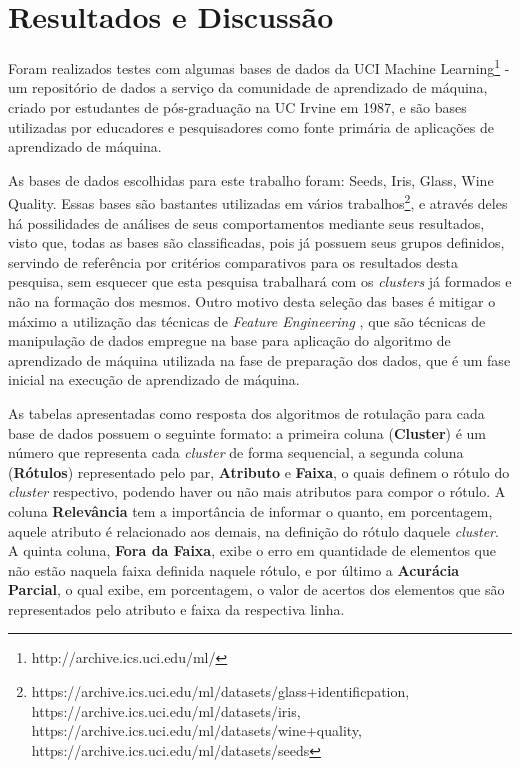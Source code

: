 \chapter{Resultados e Discussão}\label{cap:resultados}

Foram realizados testes com algumas bases de dados da UCI Machine Learning\footnote{http://archive.ics.uci.edu/ml/} - um repositório de dados a serviço da comunidade de aprendizado de máquina, criado por estudantes de pós-graduação na UC Irvine em 1987, e são bases utilizadas por educadores e pesquisadores como fonte primária de aplicações de aprendizado de máquina. 


As bases de dados escolhidas para este trabalho foram: Seeds, Iris, Glass, Wine Quality. Essas bases são bastantes utilizadas em vários trabalhos\footnote{https://archive.ics.uci.edu/ml/datasets/glass+identificpation, https://archive.ics.uci.edu/ml/datasets/iris, https://archive.ics.uci.edu/ml/datasets/wine+quality, https://archive.ics.uci.edu/ml/datasets/seeds}, e através deles há possilidades de análises de seus comportamentos mediante seus resultados, visto que, todas as bases são classificadas, pois já possuem seus grupos definidos, servindo de referência por critérios comparativos para os resultados desta pesquisa, sem esquecer que esta pesquisa trabalhará com os \textit{clusters} já formados e não na formação dos mesmos. Outro motivo desta seleção das bases  é mitigar o máximo a utilização das técnicas de \textit{Feature Engineering} \cite{Casari2018}, que são técnicas de manipulação de dados empregue na base para aplicação do algoritmo de aprendizado de máquina utilizada na fase de preparação dos dados, que é um fase inicial na execução de aprendizado de máquina. 

As tabelas apresentadas como resposta dos algoritmos de rotulação para cada base de dados possuem o seguinte formato: a primeira coluna (\textbf{Cluster}) é um número que representa cada \textit{cluster} de forma sequencial, a segunda coluna (\textbf{Rótulos}) representado pelo par, \textbf{Atributo} e \textbf{Faixa}, o quais definem o rótulo do \textit{cluster} respectivo, podendo haver ou não mais atributos para compor o rótulo. A coluna \textbf{Relevância} tem a importância de informar o quanto, em porcentagem, aquele atributo é relacionado aos demais, na definição do rótulo daquele \textit{cluster}. A quinta coluna, \textbf{Fora da Faixa}, exibe o erro em quantidade de elementos que não estão naquela faixa definida naquele rótulo, e por último a \textbf{Acurácia Parcial}, o qual exibe, em porcentagem, o valor de acertos dos elementos que são representados pelo atributo e faixa da respectiva linha. 

